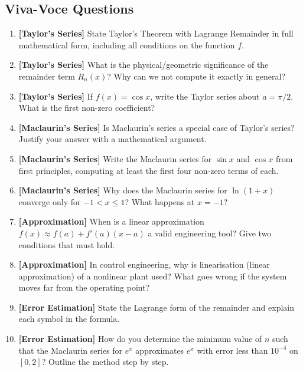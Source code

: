 \documentclass[12pt,a4paper]{article}
\begin{document}
\subsection*{Viva-Voce Questions}

\begin{enumerate}[leftmargin=2em, label=\textbf{V\arabic*.}]

\item \textbf{[Taylor's Series]} State Taylor's Theorem with Lagrange Remainder in full mathematical
  form, including all conditions on the function \(f\).

\item \textbf{[Taylor's Series]} What is the physical/geometric significance of the remainder term
  \(R_n(x)\)? Why can we not compute it exactly in general?

\item \textbf{[Taylor's Series]} If \(f(x) = \cos x\), write the Taylor series about
  \(a = \pi/2\). What is the first non-zero coefficient?

\item \textbf{[Maclaurin's Series]} Is Maclaurin's series a special case of Taylor's series?
  Justify your answer with a mathematical argument.

\item \textbf{[Maclaurin's Series]} Write the Maclaurin series for \(\sin x\) and \(\cos x\)
  from first principles, computing at least the first four non-zero terms of each.

\item \textbf{[Maclaurin's Series]} Why does the Maclaurin series for \(\ln(1+x)\) converge only
  for \(-1 < x \leq 1\)? What happens at \(x = -1\)?

\item \textbf{[Approximation]} When is a linear approximation \(f(x) \approx f(a) + f'(a)(x-a)\)
  a valid engineering tool? Give two conditions that must hold.

\item \textbf{[Approximation]} In control engineering, why is linearisation (linear approximation)
  of a nonlinear plant used? What goes wrong if the system moves far from the operating point?

\item \textbf{[Error Estimation]} State the Lagrange form of the remainder and explain each symbol
  in the formula.

\item \textbf{[Error Estimation]} How do you determine the minimum value of \(n\) such that the
  Maclaurin series for \(e^x\) approximates \(e^x\) with error less than \(10^{-4}\) on
  \([0,2]\)? Outline the method step by step.

\end{enumerate}
\end{document}
